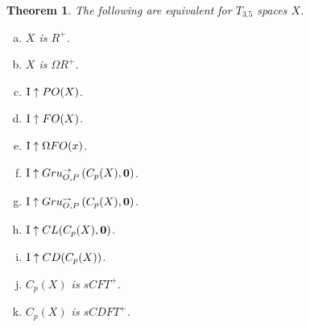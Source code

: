 \documentclass{amsart}
\theoremstyle{plain}
\newtheorem{theorem}{Theorem}
\theoremstyle{definition}
\theoremstyle{remark}
\theoremstyle{plain}
\theoremstyle{definition}
\theoremstyle{remark}
\begin{document}
\begin{theorem}
 The following are equivalent for \(T_{3.5}\) spaces \(X\).
 \begin{enumerate}[a)]
  \item \(X\) is \(R^+\).
  \item \(X\) is \(\Omega R^+\).
  \item \(\mathrm{I}\uparrow PO(X)\). 
  \item \(\mathrm{I}\uparrow FO(X)\).
  \item \(\mathrm{I}\uparrow\Omega FO(x)\).
  \item \(\mathrm{I}\uparrow Gru_{O,P}^{\to}\left({C_p(X)},{\mathbf 0}\right)\).
  \item \(\mathrm{I}\uparrow Gru_{O,P}^{\leadsto}\left({C_p(X)},{\mathbf 0}\right)\).
  \item \(\mathrm{I}\uparrow CL(C_p(X),\mathbf 0)\).
  \item \(\mathrm{I}\uparrow CD(C_p(X))\).
  \item \(C_p(X)\) is \(sCFT^+\).
  \item \(C_p(X)\) is \(sCDFT^+\).
 \end{enumerate}
\end{theorem}
\end{document}

